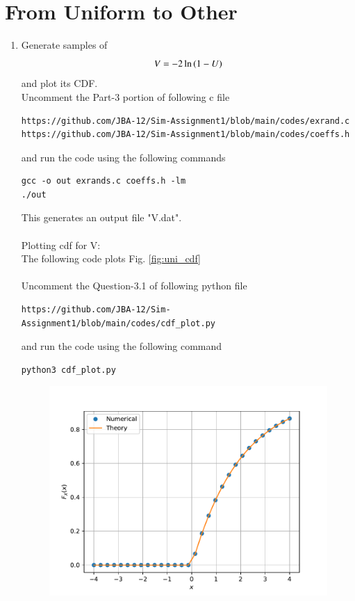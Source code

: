 \documentclass[journal,12pt,twocolumn]{IEEEtran}
\renewcommand\thesection{\arabic{section}}
\begin{document}
\section{From Uniform to Other}
\begin{enumerate}[label=\thesection.\arabic*
,ref=\thesection.\theenumi]
%
\item
Generate samples of 
%
\begin{equation}
V = -2\ln\left(1-U\right)
\end{equation}
%
and plot its CDF. \\
\solution Uncomment the Part-3 portion of following c file 
\begin{lstlisting}
https://github.com/JBA-12/Sim-Assignment1/blob/main/codes/exrand.c
https://github.com/JBA-12/Sim-Assignment1/blob/main/codes/coeffs.h
\end{lstlisting}
and run the code using the following commands
\begin{lstlisting}
gcc -o out exrands.c coeffs.h -lm
./out
\end{lstlisting}
This generates an output file "V.dat".\\\\
Plotting cdf for V:\\
The following code plots Fig. \ref{fig:uni_cdf}\\\\
Uncomment the Question-3.1 of following python file
\begin{lstlisting}
https://github.com/JBA-12/Sim-Assignment1/blob/main/codes/cdf_plot.py
\end{lstlisting}
and run the code using the following command
\begin{lstlisting}
python3 cdf_plot.py
\end{lstlisting}
\begin{figure}[!htbp]
\centering
\includegraphics[width=\columnwidth]{./figs/v_cdf}

\end{figure}
\end{enumerate}
\end{document}
